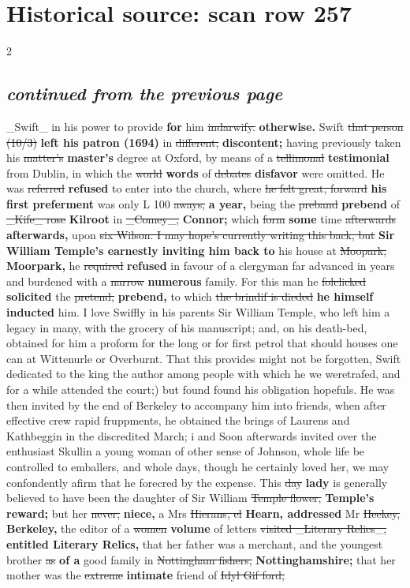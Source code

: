 \documentclass[10pt]{article}
\begin{document}
\section*{Historical source: scan row 257}
\begin{multicols}{2}
\subsection*{\textit{continued from the previous page}}
\_Swift\_ in his power to provide \textbf{for} him \sout{indarwify.} \textbf{otherwise.} Swift \sout{that person (10/3)} \textbf{left his patron (1694)} in \sout{different,} \textbf{discontent;} having previously taken his \sout{matter’s} \textbf{master's} degree at Oxford, by means of a \sout{tellimonal} \textbf{testimonial} from Dublin, in which the \sout{world} \textbf{words} of \sout{debates} \textbf{disfavor} were omitted. He was \sout{referred} \textbf{refused} to enter into the church, where \sout{he felt great, forward} \textbf{his first preferment} was only L 100 \sout{aways,} \textbf{a year,} being the \sout{preband} \textbf{prebend} of \sout{\_Kife\_ rose} \textbf{Kilroot} in \sout{\_Comey\_,} \textbf{Connor;} which \sout{form} \textbf{some} time \sout{afterwards} \textbf{afterwards,} upon \sout{six Wilson. I may hope’s currently writing this back, but} \textbf{Sir William Temple's earnestly inviting him back to} his house at \sout{Moopark,} \textbf{Moorpark,} he \sout{required} \textbf{refused} in favour of a clergyman far advanced in years and burdened with a \sout{narrow} \textbf{numerous} family. For this man he \sout{folclicked} \textbf{solicited} the \sout{pretend,} \textbf{prebend,} to which \sout{the brindif is dieded} \textbf{he himself inducted} him. I love Swiffly in his parents Sir William Temple, who left him a legacy in many, with the grocery of his manuscript; and, on his death-bed, obtained for him a proform for the long or for first petrol that should houses one can at Wittenurle or Overburnt. That this provides might not be forgotten, Swift dedicated to the king the author among people with which he we weretrafed, and for a while attended the court;) but found found his obligation hopefuls. He was then invited by the end of Berkeley to accompany him into friends, when after effective crew rapid fruppments, he obtained the brings of Laurens and Kathbeggin in the discredited March; i and Soon afterwards invited over the enthusiast Skullin a young woman of other sense of Johnson, whole life be controlled to emballers, and whole days, though he certainly loved her, we may confondently afirm that he forecred by the expense. This \sout{day} \textbf{lady} is generally believed to have been the daughter of Sir William \sout{Temple flower,} \textbf{Temple's reward;} but her \sout{never,} \textbf{niece,} a Mrs \sout{Hierans, el} \textbf{Hearn, addressed} Mr \sout{Heekey,} \textbf{Berkeley,} the editor of a \sout{women} \textbf{volume} of letters \sout{visited \_Literary Relics\_,} \textbf{entitled Literary Relics,} that her father was a merchant, and the youngest brother \sout{as} \textbf{of a} good family in \sout{Nottingham fishers,} \textbf{Nottinghamshire;} that her mother was the \sout{extreme} \textbf{intimate} friend of \sout{Idyl Gif ford,} 
\end{multicols}
\end{document}
